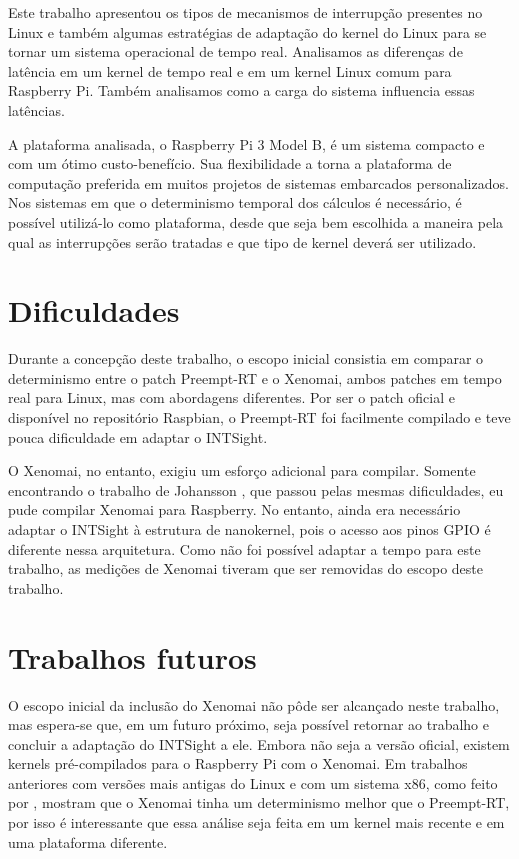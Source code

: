 \label{cap5}

Este trabalho apresentou os tipos de mecanismos de interrupção presentes no Linux e também algumas estratégias de adaptação do kernel do Linux para se tornar um sistema operacional de tempo real. Analisamos as diferenças de latência em um kernel de tempo real e em um kernel Linux comum para Raspberry Pi. Também analisamos como a carga do sistema influencia essas latências.

A plataforma analisada, o Raspberry Pi 3 Model B, é um sistema compacto e com um ótimo custo-benefício. Sua flexibilidade a torna a plataforma de computação preferida em muitos projetos de sistemas embarcados personalizados. Nos sistemas em que o determinismo temporal dos cálculos é necessário, é possível utilizá-lo como plataforma, desde que seja bem escolhida a maneira pela qual as interrupções serão tratadas e que tipo de kernel deverá ser utilizado.

\section{Dificuldades} \label{Dificuldades}

Durante a concepção deste trabalho, o escopo inicial consistia em comparar o determinismo entre o patch Preempt-RT e o Xenomai, ambos patches em tempo real para Linux, mas com abordagens diferentes. Por ser o patch oficial e disponível no repositório Raspbian, o Preempt-RT foi facilmente compilado e teve pouca dificuldade em adaptar o INTSight.

O Xenomai, no entanto, exigiu um esforço adicional para compilar. Somente encontrando o trabalho de Johansson \cite{Johansson2018}, que passou pelas mesmas dificuldades, eu pude compilar Xenomai para Raspberry. No entanto, ainda era necessário adaptar o INTSight à estrutura de nanokernel, pois o acesso aos pinos GPIO é diferente nessa arquitetura. Como não foi possível adaptar a tempo para este trabalho, as medições de Xenomai tiveram que ser removidas do escopo deste trabalho.

\section{Trabalhos futuros}

O escopo inicial da inclusão do Xenomai não pôde ser alcançado neste trabalho, mas espera-se que, em um futuro próximo, seja possível retornar ao trabalho e concluir a adaptação do INTSight a ele. Embora não seja a versão oficial, existem kernels pré-compilados para o Raspberry Pi com o Xenomai. Em trabalhos anteriores com versões mais antigas do Linux e com um sistema x86, como feito por \cite{Regnier2008}, mostram que o Xenomai tinha um determinismo melhor que o Preempt-RT, por isso é interessante que essa análise seja feita em um kernel mais recente e em uma plataforma diferente.

